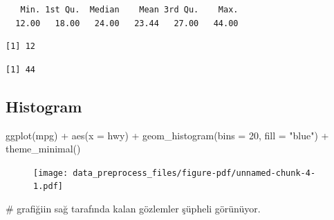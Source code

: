 \documentclass[
  letterpaper,
  DIV=11,
  numbers=noendperiod]{scrreprt}
\newenvironment{Shaded}{\begin{snugshade}}{\end{snugshade}}
\newcommand{\AttributeTok}[1]{\textcolor[rgb]{0.40,0.45,0.13}{#1}}
\newcommand{\CommentTok}[1]{\textcolor[rgb]{0.37,0.37,0.37}{#1}}
\newcommand{\DecValTok}[1]{\textcolor[rgb]{0.68,0.00,0.00}{#1}}
\newcommand{\FunctionTok}[1]{\textcolor[rgb]{0.28,0.35,0.67}{#1}}
\newcommand{\NormalTok}[1]{\textcolor[rgb]{0.00,0.23,0.31}{#1}}
\newcommand{\SpecialCharTok}[1]{\textcolor[rgb]{0.37,0.37,0.37}{#1}}
\newcommand{\StringTok}[1]{\textcolor[rgb]{0.13,0.47,0.30}{#1}}
\begin{document}
\begin{verbatim}
   Min. 1st Qu.  Median    Mean 3rd Qu.    Max. 
  12.00   18.00   24.00   23.44   27.00   44.00 
\end{verbatim}

\begin{Shaded}
\end{Shaded}

\begin{verbatim}
[1] 12
\end{verbatim}

\begin{Shaded}
\end{Shaded}

\begin{verbatim}
[1] 44
\end{verbatim}

\hypertarget{histogram}{%
\subsection*{Histogram}\label{histogram}}

\begin{Shaded}
\begin{Highlighting}[]
\FunctionTok{ggplot}\NormalTok{(mpg) }\SpecialCharTok{+}
  \FunctionTok{aes}\NormalTok{(}\AttributeTok{x =}\NormalTok{ hwy) }\SpecialCharTok{+}
  \FunctionTok{geom\_histogram}\NormalTok{(}\AttributeTok{bins =} \DecValTok{20}\NormalTok{, }\AttributeTok{fill =} \StringTok{"blue"}\NormalTok{) }\SpecialCharTok{+}
  \FunctionTok{theme\_minimal}\NormalTok{()}
\end{Highlighting}
\end{Shaded}

\begin{figure}[H]

{\centering \texttt{[image: data\_preprocess\_files/figure-pdf/unnamed-chunk-4-1.pdf]}

}

\end{figure}

\begin{Shaded}
\begin{Highlighting}[]
\CommentTok{\# grafiğiin sağ tarafında kalan gözlemler şüpheli görünüyor.}
\end{Highlighting}
\end{Shaded}
\end{document}
